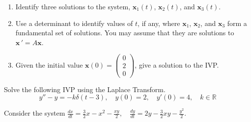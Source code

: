 \documentclass[11pt]{exam}
\begin{document}
\begin{questions}
    \begin{enumerate}[label=\roman*)]
      \item Identify three solutions to the system, $\mathbf x_1(t)$, $\mathbf x_2(t)$, and $\mathbf x_3(t)$. 
      \vspace{3cm} 
      \item Use a determinant to identify values of $t$, if any, where $\mathbf x_1$, $\mathbf x_2$, and $\mathbf x_3$ form a fundamental set of solutions. You may assume that they are solutions to $\mathbf x \, ' = A\mathbf x$. 
      \vspace{3cm}
      \item Given the initial value $\mathbf x(0) = \begin{pmatrix}0\\2\\0\end{pmatrix}$, give a solution to the IVP.  
      
    \end{enumerate}    
    \newpage \InitialsRight 
    \LastPage     
  
    
    \newpage \InitialsLeft
    \question[7] Solve the following IVP using the Laplace Transform. 
        $$y''-y=-k\delta(t-3), \quad y(0)=2,\quad y'(0)=4, \quad k \in \mathbb R$$  %
      
    
    
    
\newpage \InitialsRight
    \question[14] 
    Consider the system $\displaystyle \frac{dx}{dt} = \frac32 x - x^2 - \frac{xy}{2} , \quad \frac{dy}{dt} = 2y - \frac 32 xy - \frac{y^2}{2}$. %
    
\newpage \InitialsLeft \\ \LastPage     
    

\newpage \InitialsRight


\end{questions}
\end{document}
